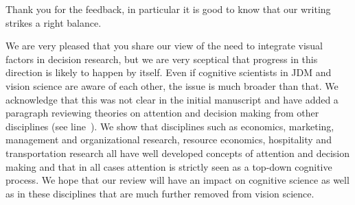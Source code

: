 Thank you for the feedback, in particular it is good to know that our writing strikes a right balance.



We are very pleased that you share our view of the need to integrate visual factors in decision research, but we are very sceptical that progress in this direction is likely to happen by itself. Even if cognitive scientists in JDM and vision science are aware of each other, the issue is much broader than that. We acknowledge that this was not clear in the initial manuscript and have added a paragraph reviewing theories on attention and decision making from other disciplines (see line~). We show that disciplines such as economics, marketing, management and organizational research, resource economics, hospitality and transportation research all have well developed concepts of attention and decision making and that in all cases attention is strictly seen as a top-down cognitive process. We hope that our review will have an impact on cognitive science as well as in these disciplines that are much further removed from vision science. \\

